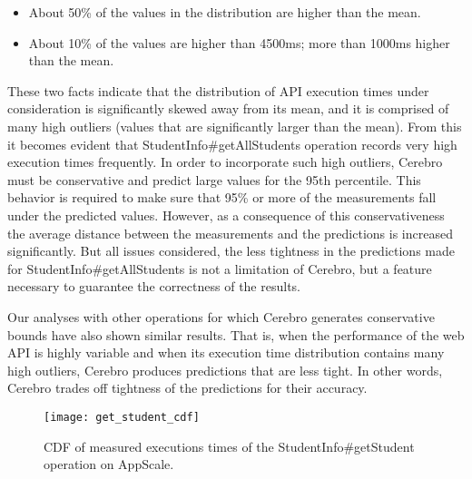 \begin{itemize}
\item About 50\% of the values in the distribution are higher than the mean.
\item About 10\% of the values are higher than 4500ms; more than 1000ms higher than the mean.
\end{itemize}

These two facts indicate that the distribution of API execution times under consideration is significantly skewed away from its 
mean, and it is comprised of many high outliers (values that are significantly larger than the mean).
From this it becomes evident that StudentInfo\#getAllStudents operation records very high execution times frequently. 
In order to incorporate such high outliers, Cerebro must be conservative and predict large values for
the 95th percentile. This behavior is required to make sure that 95\% or more of the measurements fall under the
predicted values. However, as a consequence of this conservativeness the average distance between the measurements and 
the predictions is increased significantly. But all issues considered, the less tightness in the predictions made for StudentInfo\#getAllStudents
is not a limitation of Cerebro, but a feature necessary to guarantee the correctness of the results.

Our analyses with other operations for which
Cerebro generates conservative bounds have also shown similar results. That is, when the performance of the web API is highly variable and
when its execution time distribution contains
many high outliers, Cerebro produces predictions that are less tight. In other words, Cerebro trades off tightness of the predictions 
for their accuracy.

\begin{figure}
\centering
\texttt{[image: get\_student\_cdf]}
\caption{CDF of measured executions times of the StudentInfo\#getStudent operation on AppScale.}
\label{fig:get_student_cdf}
\end{figure}

